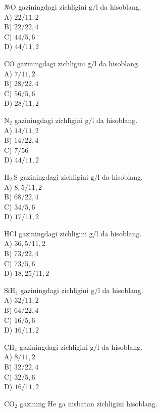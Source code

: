   \item №O gaziningdagi zichligini $\mathrm{g} / \mathrm{l}$ da hisoblang.\\
A) $22 / 11,2$\\
B) $22 / 22,4$\\
C) $44 / 5,6$\\
D) $44 / 11,2$
  \item CO gaziningdagi zichligini $\mathrm{g} / \mathrm{l}$ da hisoblang.\\
A) $7 / 11,2$\\
B) $28 / 22,4$\\
C) $56 / 5,6$\\
D) $28 / 11,2$
  \item $\mathrm{N}_{2}$ gaziningdagi zichligini $\mathrm{g} / \mathrm{l}$ da hisoblang.\\
A) $14 / 11,2$\\
B) $14 / 22,4$\\
C) $7 / 56$\\
D) $44 / 11,2$
  \item $\mathrm{H}_{2} \mathrm{~S}$ gaziningdagi zichligini $\mathrm{g} / \mathrm{l}$ da hisoblang.\\
A) $8,5 / 11,2$\\
B) $68 / 22,4$\\
C) $34 / 5,6$\\
D) $17 / 11,2$
  \item HCl gaziningdagi zichligini $\mathrm{g} / \mathrm{l}$ da hisoblang.\\
A) $36,5 / 11,2$\\
B) $73 / 22,4$\\
C) $73 / 5,6$\\
D) $18,25 / 11,2$
  \item $\mathrm{SiH}_{4}$ gaziningdagi zichligini $\mathrm{g} / \mathrm{l}$ da hisoblang.\\
A) $32 / 11,2$\\
B) $64 / 22,4$\\
C) $16 / 5,6$\\
D) $16 / 11,2$
  \item $\mathrm{CH}_{4}$ gaziningdagi zichligini $\mathrm{g} / \mathrm{l}$ da hisoblang.\\
A) $8 / 11,2$\\
B) $32 / 22,4$\\
C) $32 / 5,6$\\
D) $16 / 11,2$
  \item $\mathrm{CO}_{2}$ gazining He ga nisbatan zichligini hisoblang.\\
